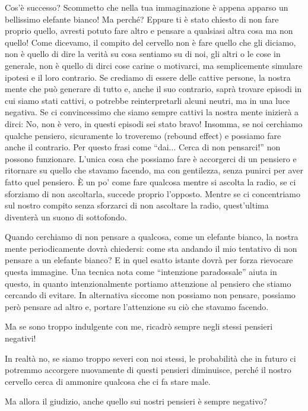 \documentclass[12pt]{book} %
\begin{document}
Cos'è successo? Scommetto che nella tua immaginazione è appena apparso un bellissimo elefante
bianco! Ma perché? Eppure ti è stato chiesto di non fare proprio quello, avresti potuto fare altro e pensare a
qualsiasi altra cosa ma non quello! Come dicevamo, il compito del cervello non è fare quello che gli diciamo, non è
quello di dire la verità su cosa sentiamo su di noi, gli altri o le cose in generale, non è quello di dirci cose carine
o motivarci, ma semplicemente simulare ipotesi e il loro contrario. Se crediamo di essere delle cattive persone, la
nostra mente che può generare di tutto e, anche il suo contrario, saprà trovare episodi in cui siamo stati cattivi, o
potrebbe reinterpretarli alcuni neutri, ma in una luce negativa. Se ci convincessimo che siamo sempre cattivi la nostra
mente inizierà a dirci: No, non è vero, in questi episodi sei stato bravo! Insomma, se noi cerchiamo qualche pensiero,
sicuramente lo troveremo (rebound effect) e possiamo fare anche il contrario. Per questo frasi come “dai... Cerca di
non pensarci!” non possono funzionare. L'unica cosa che possiamo fare è accorgerci di un pensiero
e ritornare su quello che stavamo facendo, ma con gentilezza, senza punirci per aver fatto quel pensiero. È un
po' come fare qualcosa mentre si ascolta la radio, se ci sforziamo di non ascoltarla, succede
proprio l'opposto. Mentre se ci concentriamo sul nostro compito senza sforzarci di non ascoltare
la radio, quest'ultima diventerà un suono di sottofondo.

Quando cerchiamo di non pensare a qualcosa, come un elefante bianco, la nostra mente periodicamente dovrà chiedersi:
come sta andando il mio tentativo di non pensare a un elefante bianco? E in quel esatto istante dovrà per forza
rievocare questa immagine. Una tecnica nota come “intenzione paradossale” aiuta in questo, in quanto intenzionalmente
portiamo attenzione al pensiero che stiamo cercando di evitare. In alternativa siccome non possiamo non pensare,
possiamo però pensare ad altro e, portare l'attenzione su ciò che stavamo facendo. 

Ma se sono troppo indulgente con me, ricadrò sempre negli stessi pensieri negativi! 

In realtà no, se siamo troppo severi con noi stessi, le probabilità che in futuro ci potremmo accorgere nuovamente di
questi pensieri diminuisce, perché il nostro cervello cerca di ammonire qualcosa che ci fa stare male. 

Ma allora il giudizio, anche quello sui nostri pensieri è sempre negativo?
\end{document}
